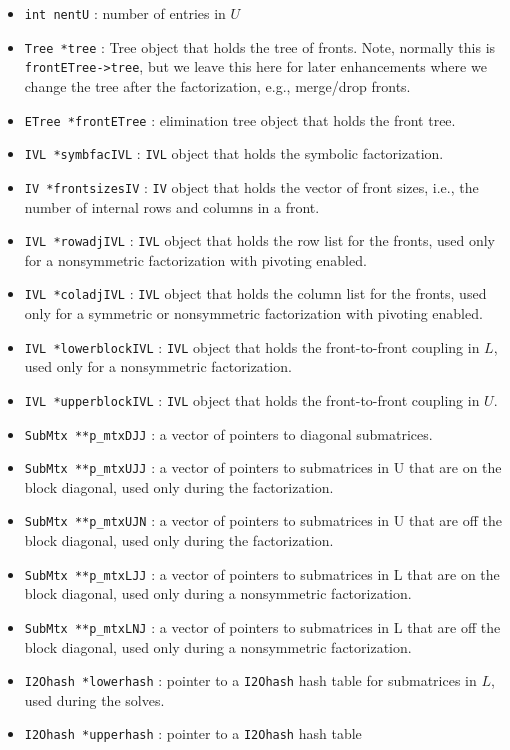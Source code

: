 \begin{itemize}
\item
{\tt int nentU} : number of entries in $U$
\item
{\tt Tree *tree} : Tree object that holds the tree of fronts.
Note, normally this is {\tt frontETree->tree}, but we leave this
here for later enhancements where we change the tree after the
factorization, e.g., merge/drop fronts.
\item
{\tt ETree *frontETree} : elimination tree object that holds the
front tree.
\item
{\tt IVL *symbfacIVL} : {\tt IVL} object that holds the
symbolic factorization.
\item
{\tt IV *frontsizesIV} : {\tt IV} object that holds the
vector of front sizes, i.e., the number of internal rows
and columns in a front.
\item
{\tt IVL *rowadjIVL} : {\tt IVL} object that holds the
row list for the fronts, used only for a nonsymmetric factorization
with pivoting enabled.
\item
{\tt IVL *coladjIVL} : {\tt IVL} object that holds the
column list for the fronts, used only for a symmetric or
nonsymmetric factorization with pivoting enabled.
\item
{\tt IVL *lowerblockIVL} : {\tt IVL} object that holds the
front-to-front coupling in $L$, used only for a
nonsymmetric factorization.
\item
{\tt IVL *upperblockIVL} : {\tt IVL} object that holds the
front-to-front coupling in $U$.
\item
{\tt SubMtx **p\_mtxDJJ} : a vector of pointers to diagonal submatrices.
\item
{\tt SubMtx **p\_mtxUJJ} : a vector of pointers to  submatrices in U
that are on the block diagonal, used only during the factorization.
\item
{\tt SubMtx **p\_mtxUJN} : a vector of pointers to  submatrices in U
that are off the block diagonal, used only during the factorization.
\item
{\tt SubMtx **p\_mtxLJJ} : a vector of pointers to  submatrices in L
that are on the block diagonal, used only during a nonsymmetric 
factorization.
\item
{\tt SubMtx **p\_mtxLNJ} : a vector of pointers to  submatrices in L
that are off the block diagonal, used only during a nonsymmetric 
factorization.
\item
{\tt I2Ohash *lowerhash} : pointer to a {\tt I2Ohash} hash table
for submatrices in $L$, used during the solves.
\item
{\tt I2Ohash *upperhash} : pointer to a {\tt I2Ohash} hash table

\end{itemize}

